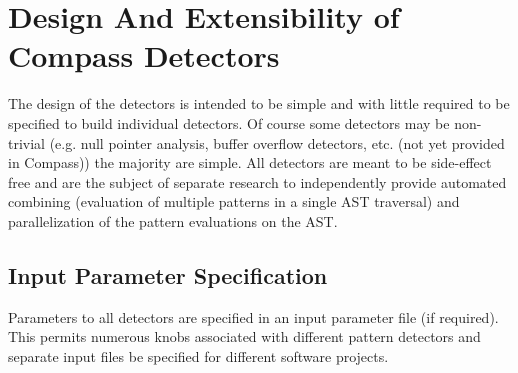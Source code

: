 
\section{Design And Extensibility of Compass Detectors}

    The design of the detectors is intended to be simple
and with little required to be specified to build individual
detectors.  Of course some detectors may be non-trivial
(e.g. null pointer analysis, buffer overflow detectors, etc. 
(not yet provided in Compass)) the majority are simple.  All
detectors are meant to be side-effect free and are the subject
of separate research to independently provide automated 
combining (evaluation of multiple patterns in a single AST
traversal) and parallelization of the pattern evaluations on 
the AST.

\subsection{Input Parameter Specification}

    Parameters to all detectors are specified in an 
input parameter file (if required).  This permits numerous
knobs associated with different pattern detectors and separate
input files be specified for different software projects.


